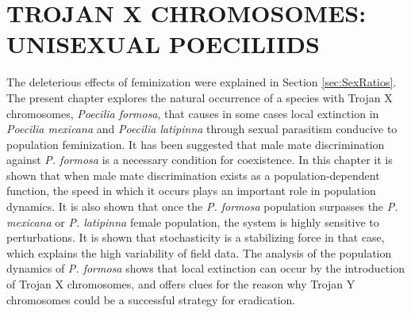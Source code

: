 \chapter{TROJAN X CHROMOSOMES: UNISEXUAL POECILIIDS}\label{chap:POECILIA}
	The deleterious effects of feminization were explained  in Section \ref{sec:SexRatios}. The present chapter explores the natural occurrence of a species with Trojan X chromosomes, \textit{Poecilia formosa}, that causes in some cases local extinction in \textit{Poecilia mexicana} and \textit{Poecilia latipinna} through sexual parasitism conducive to population feminization. It has been suggested that male mate discrimination against \textit{P. formosa} is a necessary condition for coexistence. In this chapter it is shown that when male mate discrimination exists as a population-dependent function, the speed in which it occurs plays an important role in population dynamics. It is also shown that once the \textit{P. formosa} population surpasses the \textit{P. mexicana} or \textit{P. latipinna} female population, the system is highly sensitive to perturbations. It is shown that stochasticity is a stabilizing force in that case, which explains the high variability of field data. The analysis of the population dynamics of \textit{P. formosa} shows that local extinction can occur by the introduction of Trojan X chromosomes, and offers clues for the reason why Trojan Y chromosomes could be a successful strategy for eradication.  

